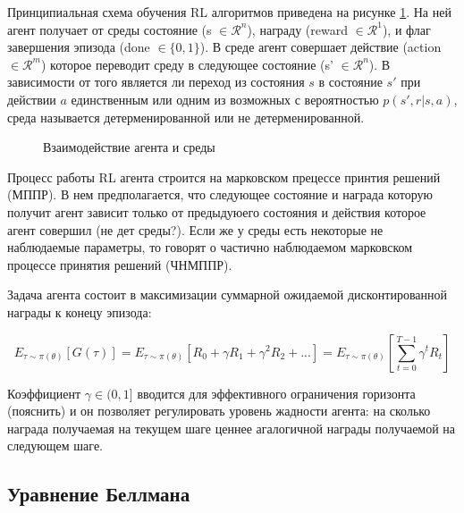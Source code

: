 Принципиальная схема обучения RL алгоритмов приведена на рисунке \ref{fig:rl}. На ней агент получает от среды состояние (s $\in \mathcal{R}^n$), награду (reward $\in \mathcal{R}^1$), и флаг завершения эпизода (done $\in \{0, 1\}$).  В среде агент совершает действие (action $\in \mathcal{R}^m$) которое переводит среду в следующее состояние (s' $\in \mathcal{R}^n$). В зависимости от того является ли переход из состояния $s$ в состояние $s'$ при действии $a$ единственным или одним из возможных с вероятностью $p(s',r|s,a)$, среда называется детерменированной или не детерменированной. 

\begin{figure}[ht]
	\caption{Взаимодействие агента и среды}
	\label{fig:rl}
\end{figure}

Процесс работы RL агента строится на марковском прецессе принтия решений (МППР). В нем предполагается, что следующее состояние и награда которую получит агент зависит только от предыдуюего состояния и действия которое агент совершил (не дет среды?). Если же у среды есть некоторые не наблюдаемые параметры, то говорят о частично наблюдаемом марковском процессе принятия решений (ЧНМППР). 

Задача агента состоит в максимизации суммарной ожидаемой дисконтированной награды к конецу эпизода:

\begin{equation}
E_{\tau \sim \pi(\theta)} [G(\tau)] = E_{\tau \sim \pi(\theta)} [R_0 + \gamma R_{1} + \gamma ^ 2 R_{2} + ...] = E_{\tau \sim \pi(\theta)} [\sum_{t=0}^{T - 1} \gamma ^t R_{t}]
\end{equation}

Коэффициент $\gamma \in (0, 1]$ вводится для эффективного ограничения горизонта (пояснить) и он позволяет регулировать уровень жадности агента: на сколько награда получаемая на текущем шаге ценнее агалогичной награды получаемой на следующем шаге.  


\subsection{Уравнение Беллмана}

